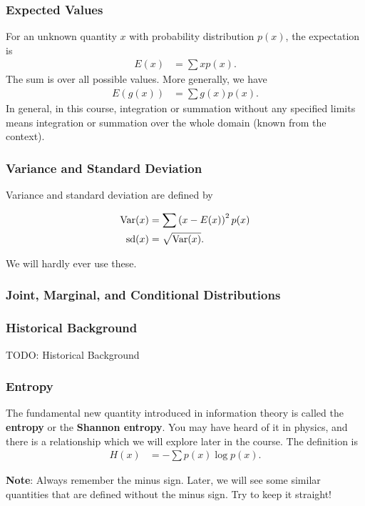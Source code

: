 \documentclass{beamer}
\begin{document}
\begin{frame}
\frametitle{Expected Values}
For an unknown quantity $x$ with probability distribution $p(x)$,
the expectation is
\begin{align}
E(x) &= \sum x p(x).
\end{align}
The sum is over all possible values. \pause
More generally, we have
\begin{align}
E(g(x)) &= \sum g(x) p(x).
\end{align}\pause
\pause
In general, in this course, integration or summation without
any specified limits means integration or summation over the
whole domain (known from the context).

\end{frame}

\begin{frame}
\frametitle{Variance and Standard Deviation}
Variance and standard deviation are defined by

\begin{align}
\textnormal{Var}(x) &= \sum \left(x - E(x)\right)^2 p(x) \\
\textnormal{sd}(x) &= \sqrt{\textnormal{Var}(x)}.
\end{align}

\pause
We will hardly ever use these.

\end{frame}


\begin{frame}
\frametitle{Joint, Marginal, and Conditional Distributions}
\end{frame}


\begin{frame}
\frametitle{Historical Background}
TODO: Historical Background

\end{frame}


\begin{frame}
\frametitle{Entropy}
The fundamental new quantity introduced in information theory
is called the {\bf entropy} or the {\bf Shannon entropy}.
You may have heard of it in physics,
and there is a relationship which we will explore later in the
course. The definition is
\begin{align}
H(x) &= -\sum p(x) \log p(x).
\end{align}
\pause

{\bf Note}: Always remember the minus sign. Later, we will
see some similar quantities that are defined without the minus
sign. Try to keep it straight!
\end{frame}
\end{document}
